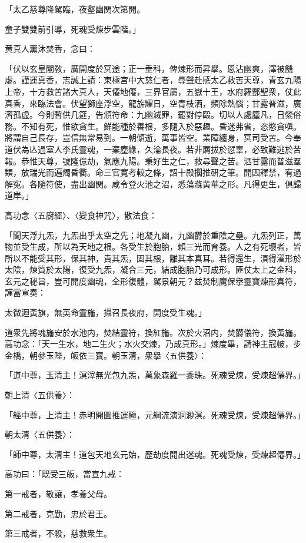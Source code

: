 「太乙慈尊降駕臨，夜壑幽関次第開。

童子雙雙前引導，死魂受煉步雲階。」

黄真人薰沐焚香，念曰：

「伏以玄皇闡敎，廣開度於冥途；正一垂科，俾煉形而昇擧。恩沾幽爽，澤被饑虚。謹運真香，志誠上請：東極宫中大慈仁者，尋聲赴感太乙救苦天尊，青玄九陽上帝，十方救苦諸大真人，天僊地僊，三界官屬，五嶽十王，水府羅酆聖衆，仗此真香，來臨法會。伏望獅座浮空，龍旂耀日，空青枝洒，頻除熱惱；甘露普滋，廣濟孤虚。今則暫供几筵，告頒符命：九幽滅罪，罷對停毆。切以人處塵凡，日縈俗務。不知有死，惟欲貪生。鮮能種於善根，多隨入於惡趣。昏迷弗省，恣慾貪嗔。將謂自己長存，豈信無常易到。一朝傾逝，萬事皆空。業障纏身，冥司受苦。今奉道伏為亾過室人李氏靈魂，一棄塵緣，久淪長夜。若非薦拔於愆辜，必致難逃於苦報。恭惟天尊，號隆億劫，氣應九陽。秉好生之仁，救尋聲之苦。洒甘露而普滋羣類，放瑞光而遍燭昏衢。命三官寬考較之條，詔十殿擱推硏之筆。開囚釋禁，宥過解寃。各隨符使，盡出幽関。咸令登火池之沼，悉蕩滌黄華之形。凡得更生，俱歸道岸。」

高功念〈五廚經〉、〈變食神咒〉，散法食：

「聞天浮九炁，九炁出乎太空之先；地凝九幽，九幽欝於重陰之壘。九炁列正，萬物並受生成，所以為天地之根。各受生於胞胎，賴三光而育養。人之有死壞者，皆所以不能受其形，保其神，貴其炁，固其根，離其本真耳。若得還生，湏得濯形於太陰，煉質於太陽，復受九炁，凝合三元，結成胞胎乃可成形。匪仗太上之金科，玄元之秘旨，豈可開度幽魂，全形復體，駕景朝元？兹焚制魔保擧靈寳煉形真符，謹當宣奏：

太微迴黃旗，無英命靈旛，攝召長夜府，開度受生魂。」

道衆先將魂旛安於水池内，焚結靈符，換紅旛。次於火沼内，焚欝儀符，換黃旛。高功念：「天一生水，地二生火；水火交煉，乃成真形。」煉度畢，請神主冠帔，步金橋，朝參玉陛，皈依三寳。朝玉清，衆擧〈五供養〉：

「道中尊，玉清主！溟滓無光包九炁，萬象森羅一黍珠。死魂受煉，受煉超僊界。」

朝上清〈五供養〉：

「經中尊，上清主！赤明開圖推運極，元綱流演洞渺溟。死魂受煉，受煉超僊界。」

朝太清〈五供養〉：

「師中尊，太清主！道包天地玄元始，歷劫度開出迷魂。死魂受煉，受煉超僊界。」

高功曰：「既受三皈，當宣九戒：

第一戒者，敬讓，孝養父母。

第二戒者，克勤，忠於君王。

第三戒者，不殺，慈救衆生。

